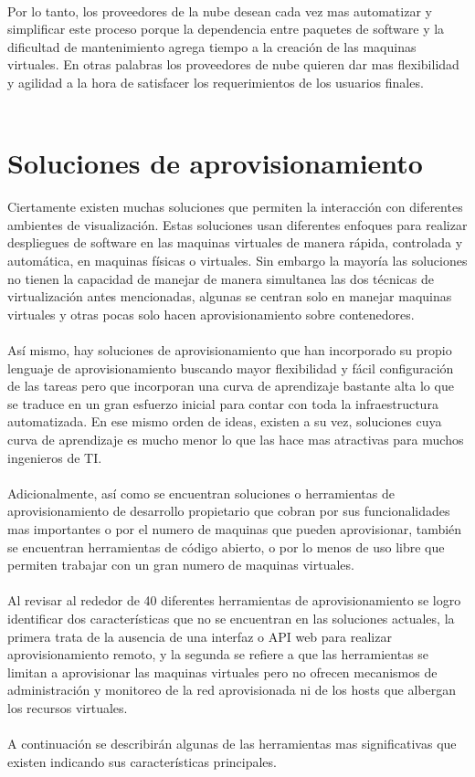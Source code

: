 \\
Por lo tanto, los proveedores de la nube desean cada vez mas automatizar y simplificar este proceso porque la dependencia entre paquetes de software y la dificultad de mantenimiento agrega tiempo a la creación de las maquinas virtuales. En otras palabras los proveedores de nube quieren dar mas flexibilidad y agilidad a la hora de satisfacer los requerimientos de los usuarios finales.\\
\\
\section{Soluciones de aprovisionamiento}
Ciertamente existen muchas soluciones que permiten la interacción con diferentes ambientes de visualización. Estas soluciones usan diferentes enfoques para realizar despliegues de software en las maquinas virtuales de manera rápida, controlada y automática, en maquinas físicas o virtuales. Sin embargo la mayoría las soluciones no tienen la capacidad de manejar de manera simultanea las dos técnicas de virtualización antes mencionadas, algunas se centran solo en manejar maquinas virtuales y otras pocas solo hacen aprovisionamiento sobre contenedores.\\
\\
Así mismo, hay soluciones de aprovisionamiento que han incorporado su propio lenguaje de aprovisionamiento buscando mayor flexibilidad y fácil configuración de las tareas pero que incorporan una curva de aprendizaje bastante alta lo que se traduce en un gran esfuerzo inicial para contar con toda la infraestructura automatizada. En ese mismo orden de ideas, existen a su vez, soluciones cuya curva de aprendizaje es mucho menor lo que las hace mas atractivas para muchos ingenieros de TI.\\
\\
Adicionalmente, así como se encuentran soluciones o herramientas de aprovisionamiento de desarrollo propietario que cobran por sus funcionalidades mas importantes o por el numero de maquinas que pueden aprovisionar, también se encuentran herramientas de código abierto, o por lo menos de uso libre que permiten trabajar con un gran numero de maquinas virtuales.\\
\\
Al revisar al rededor de 40 diferentes herramientas de aprovisionamiento se logro identificar dos características que no se encuentran en las soluciones actuales, la primera trata de la ausencia de una interfaz o API web para realizar aprovisionamiento remoto, y la segunda se refiere a que las herramientas se limitan a aprovisionar las maquinas virtuales pero no ofrecen mecanismos de administración y monitoreo de la red aprovisionada ni de los hosts que albergan los recursos virtuales.\\
\\
A continuación se describirán algunas de las herramientas mas significativas que existen indicando sus características principales.

